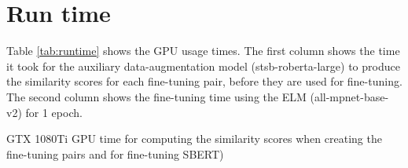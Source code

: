 \documentclass[sigconf, anonymous=true]{acmart}
\begin{document}

\section{Run time}
\label{sec:runtime}
Table \ref{tab:runtime} shows the GPU usage times. The first column shows the time it took for the auxiliary data-augmentation model (stsb-roberta-large) to produce the similarity scores for each fine-tuning pair, before they are used for fine-tuning. The second column shows the fine-tuning time using the ELM (all-mpnet-base-v2) for 1 epoch.

\begin{table}[H]
\setlength{} %
\footnotesize\centering
{}
\caption{GTX 1080Ti GPU time for computing the similarity scores when creating the fine-tuning pairs and for fine-tuning SBERT)}
\label{tab:runtime}
\end{table}
\end{document}
